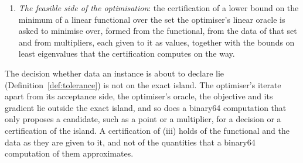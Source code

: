 \begin{definition}
\begin{enumerate}[label=(\roman*),leftmargin=2.4em]
  construction of an acceptance set from them; the exact establishment that
  the optimiser's acceptance-side iterate lies in the acceptance set it reads,
  for its initial point and for each update as a convex combination, with
  exact rational weights, of points so established; and the exact
  certification of the minimum of a linear functional over that set, or of a
  lower bound on that minimum. The acceptance set the optimiser reads is the
  set so declared: the constructed set as its producer emits it, with each
  scalar bound that a consumer has replaced as in
  Definition~\ref{def:declared-data}\,(iii) at its replaced value.
\item \emph{The feasible side of the optimisation}: the certification of a
  lower bound on the minimum of a linear functional over the set the
  optimiser's linear oracle is asked to minimise over, formed from the
  functional, from the data of that set and from multipliers, each given to
  it as values, together with the bounds on least eigenvalues that the
  certification computes on the way.
\end{enumerate}
The decision whether data an instance is about to declare lie
 (Definition~\ref{def:tolerance}) is not on
the exact island. The optimiser's iterate apart from
its acceptance side, the optimiser's oracle, the objective and its gradient lie
outside the exact island, and so does a binary64 computation that only
proposes a candidate, such as a point or a multiplier, for a decision or a
certification of the island. A certification of (iii) holds of the
functional and the data as they are given to it, and not of the quantities
that a binary64 computation of them approximates.
\end{definition}
